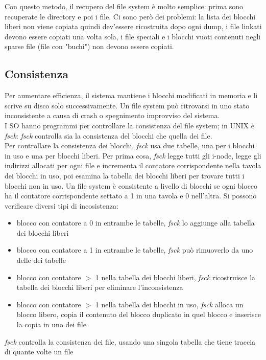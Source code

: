 \documentclass[12pt]{article}
\begin{document}
Con questo metodo, il recupero del file system è molto semplice: prima sono recuperate le directory e poi i file.
Ci sono però dei problemi: la lista dei blocchi liberi non viene copiata quindi dev'essere ricostruita dopo ogni dump,
i file linkati devono essere copiati una volta sola, i file speciali e i blocchi vuoti contenuti negli sparse file 
(file con "buchi") non devono essere copiati.
\subsection{Consistenza}
Per aumentare efficienza, il sistema mantiene i blocchi modificati in memoria e li scrive su disco solo successivamente.
Un file system può ritrovarsi in uno stato inconsistente a causa di crash o spegnimento improvviso del sistema.\\
I SO hanno programmi per controllare la consistenza del file system; in UNIX è \textit{fsck}: \textit{fsck} controlla
sia la consistenza del blocchi che quella dei file.\\
Per controllare la consistenza dei blocchi, \textit{fsck} usa due tabelle, una per i blocchi in uso e una per blocchi
liberi. Per prima cosa, \textit{fsck} legge tutti gli i-node, legge gli indirizzi allocati per ogni file e incrementa il
contatore corrispondente nella tavola dei blocchi in uso, poi esamina la tabella dei blocchi liberi per trovare tutti i
blocchi non in uso. Un file system è consistente a livello di blocchi se ogni blocco ha il contatore corrispondente
settato a 1 in una tavola e 0 nell'altra. Si possono verificare diversi tipi di incosistenza:
\begin{itemize}
    \item blocco con contatore a 0 in entrambe le tabelle, \textit{fsck} lo aggiunge alla tabella dei blocchi liberi
    \item blocco con contatore a 1 in entrambe le tabelle, \textit{fsck} può rimuoverlo da uno delle dei tabelle
    \item blocco con contatore $>$ 1 nella tabella dei blocchi liberi, \textit{fsck} ricostruisce la tabella dei blocchi
    liberi per eliminare l'inconsistenza
    \item blocco con contatore $>$ 1 nella tabella dei blocchi in uso, \textit{fsck} alloca un blocco libero, copia il
    contenuto del blocco duplicato in quel blocco e inserisce la copia in uno dei file
\end{itemize}
\textit{fsck} controlla la consistenza dei file, usando una singola tabella che tiene traccia di quante volte un file 
\end{document}
